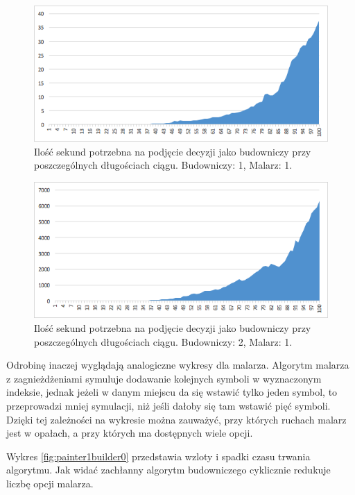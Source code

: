 \documentclass[document]{xmgr}
\begin{document}
\begin{figure}[h]
    \centering
    \includegraphics[scale = 0.7]{images/timeBuilder1Painter1}
    \caption{Ilość sekund potrzebna na podjęcie decyzji jako budowniczy przy poszczególnych długościach ciągu. Budowniczy: 1, Malarz: 1.}
    \label{fig:builder1painter1}
\end{figure}

\begin{figure}[H]
    \centering
    \includegraphics[scale = 0.7]{images/timeBuilder2Painter1}
    \caption{Ilość sekund potrzebna na podjęcie decyzji jako budowniczy przy poszczególnych długościach ciągu. Budowniczy: 2, Malarz: 1.}
    \label{fig:builder2painter1}
\end{figure}



Odrobinę inaczej wyglądają analogiczne wykresy dla malarza. Algorytm malarza z zagnieżdżeniami symuluje dodawanie kolejnych symboli w wyznaczonym indeksie, jednak jeżeli w danym miejscu da się wstawić tylko jeden symbol, to przeprowadzi mniej symulacji, niż jeśli dałoby się tam wstawić pięć symboli. Dzięki tej zależności na wykresie można zauważyć, przy których ruchach malarz jest w opałach, a przy których ma dostępnych wiele opcji.

Wykres \ref{fig:painter1builder0} przedstawia wzloty i spadki czasu trwania algorytmu. Jak widać zachłanny algorytm budowniczego cyklicznie redukuje liczbę opcji malarza.
\end{document}
